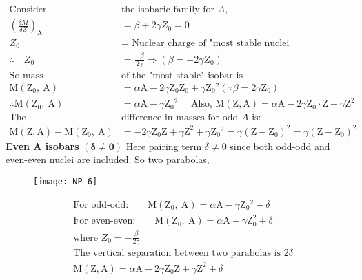 \begin{align*}
\text{Consider }&\text{the isobaric family for $A$,}\\
\left(\frac{\delta M}{\delta Z}\right)_{\mathrm{A}}&=\beta+2 \gamma Z_0=0\\
Z_0&=\text { Nuclear charge of "most stable nuclei }\\
\therefore \quad Z_0&=\frac{-\beta}{2 \gamma} \Rightarrow\left(\beta=-2 \gamma Z_0\right)\\
\text{So mass }&\text{of the "most stable" isobar is}\\
\mathrm{M}\left(\mathrm{Z}_0, \mathrm{~A}\right)&=\alpha \mathrm{A}-2 \gamma \mathrm{Z}_0 \mathrm{Z}_0+\gamma \mathrm{Z}_0{ }^2\left(\because \beta=2 \gamma \mathrm{Z}_0\right) \\
\therefore \mathrm{M}\left(\mathrm{Z}_0, \mathrm{~A}\right)&=\alpha \mathrm{A}-\gamma \mathrm{Z}_0{ }^2 \quad \text { Also, } \mathrm{M}(\mathrm{Z}, \mathrm{A})=\alpha \mathrm{A}-2 \gamma \mathrm{Z}_0 \cdot \mathrm{Z}+\gamma \mathrm{Z}^2\\
\text{The }&\text{difference in masses for odd $A$ is:}\\
\mathrm{M}(\mathrm{Z}, \mathrm{A})-\mathrm{M}\left(\mathrm{Z}_0, \mathrm{~A}\right)&=-2 \gamma \mathrm{Z}_0 \mathrm{Z}+\gamma \mathrm{Z}^2+\gamma \mathrm{Z}_0{ }^2=\gamma\left(\mathrm{Z}-\mathrm{Z}_0\right)^2=\gamma\left(\mathrm{Z}-\mathrm{Z}_0\right)^2
\end{align*}
\textbf{Even A isobars }$\mathbf{(\delta \neq 0)}$
Here pairing term $\delta \neq 0$ since both odd-odd and even-even nuclei are included. So two parabolas,
\begin{figure}[H]
	\centering
	\texttt{[image: NP-6]}
	\caption{}
	\label{}
\end{figure}
\begin{align*}
&\text{For odd-odd:}\qquad
\mathrm{M}\left(\mathrm{Z}_0, \mathrm{~A}\right)=\alpha \mathrm{A}-\gamma \mathrm{Z}_0{ }^2-\delta\\
&\text{For even-even:}\qquad 
\mathrm{M}\left(\mathrm{Z}_0, \mathrm{~A}\right)=\alpha \mathrm{A}-\gamma \mathrm{Z}_0^2+\delta\\
&\text{where }Z_0=-\frac{\beta}{2 \gamma}\\
&\text{The vertical separation between two parabolas is $2 \delta$}\\
&\mathrm{M}(\mathrm{Z}, \mathrm{A})=\alpha \mathrm{A}-2 \gamma \mathrm{Z}_0 \mathrm{Z}+\gamma \mathrm{Z}^2 \pm \delta
\end{align*}








